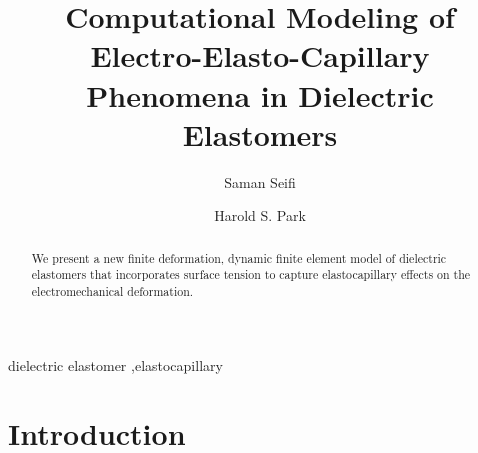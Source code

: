 \documentclass[final,authoryear,3p,times,twocolumn]{elsarticle}
\begin{document}
\begin{frontmatter}



\title{Computational Modeling of Electro-Elasto-Capillary Phenomena in Dielectric Elastomers}


\author[ss]{Saman Seifi}
\address[ss]{Department of Mechanical Engineering, Boston University, Boston, MA 02215}
\author[hsp]{Harold S. Park}
\address[hsp]{Department of Mechanical Engineering, Boston University, Boston, MA 02215}

\begin{abstract}

We present a new finite deformation, dynamic finite element model of dielectric elastomers that incorporates surface tension to capture elastocapillary effects on the electromechanical deformation.  

\end{abstract}

\begin{keyword}
dielectric elastomer \sep elastocapillary

\end{keyword} 

\end{frontmatter}


\section{Introduction} 
\end{document}
